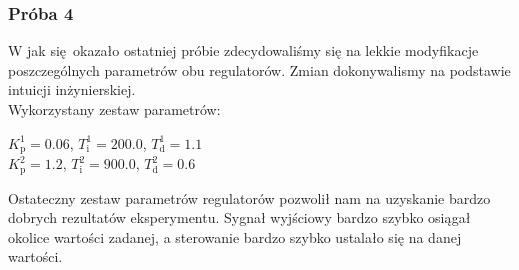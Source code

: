 
\subsubsection{Próba 4}
W jak się okazało ostatniej próbie zdecydowaliśmy się na lekkie modyfikacje poszczególnych parametrów obu
regulatorów. Zmian dokonywalismy na podstawie intuicji inżynierskiej. \\

Wykorzystany zestaw parametrów:

\begin{center}
    $K^{\num{1}}_{\mathrm{p}} = \num{0.06}$, $T^{\num{1}}_{\mathrm{i}} = \num{200.0}$, $T^{\num{1}}_{\mathrm{d}} = \num{1.1}$ \\
    $K^{\num{2}}_{\mathrm{p}} = \num{1.2}$, $T^{\num{2}}_{\mathrm{i}} = \num{900.0}$, $T^{\num{2}}_{\mathrm{d}} = \num{0.6}$ \\
\end{center}
\vspace{1cm}

Ostateczny zestaw parametrów regulatorów pozwolił nam na uzyskanie bardzo dobrych rezultatów eksperymentu.
Sygnał wyjściowy bardzo szybko osiągał okolice wartości zadanej, a sterowanie bardzo szybko ustalało się
na danej wartości.

